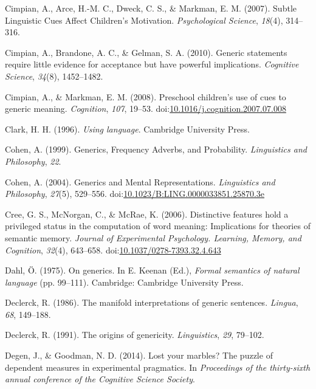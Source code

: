 \documentclass[english,,man,floatsintext]{apa6}
\theoremstyle{definition}
\theoremstyle{definition}
\theoremstyle{definition}
\theoremstyle{remark}
\begin{document}
\leavevmode\hypertarget{ref-Cimpian2007}{}%
Cimpian, A., Arce, H.-M. C., Dweck, C. S., \& Markman, E. M. (2007).
Subtle Linguistic Cues Affect Children's Motivation. \emph{Psychological
Science}, \emph{18}(4), 314--316.

\leavevmode\hypertarget{ref-Cimpian2010}{}%
Cimpian, A., Brandone, A. C., \& Gelman, S. A. (2010). Generic
statements require little evidence for acceptance but have powerful
implications. \emph{Cognitive Science}, \emph{34}(8), 1452--1482.

\leavevmode\hypertarget{ref-Cimpian2008}{}%
Cimpian, A., \& Markman, E. M. (2008). Preschool children's use of cues
to generic meaning. \emph{Cognition}, \emph{107}, 19--53.
doi:\href{https://doi.org/10.1016/j.cognition.2007.07.008}{10.1016/j.cognition.2007.07.008}

\leavevmode\hypertarget{ref-Clark1996}{}%
Clark, H. H. (1996). \emph{Using language}. Cambridge University Press.

\leavevmode\hypertarget{ref-Cohen1999}{}%
Cohen, A. (1999). Generics, Frequency Adverbs, and Probability.
\emph{Linguistics and Philosophy}, \emph{22}.

\leavevmode\hypertarget{ref-Cohen2004}{}%
Cohen, A. (2004). Generics and Mental Representations. \emph{Linguistics
and Philosophy}, \emph{27}(5), 529--556.
doi:\href{https://doi.org/10.1023/B:LING.0000033851.25870.3e}{10.1023/B:LING.0000033851.25870.3e}

\leavevmode\hypertarget{ref-Cree2006}{}%
Cree, G. S., McNorgan, C., \& McRae, K. (2006). Distinctive features
hold a privileged status in the computation of word meaning:
Implications for theories of semantic memory. \emph{Journal of
Experimental Psychology. Learning, Memory, and Cognition}, \emph{32}(4),
643--658.
doi:\href{https://doi.org/10.1037/0278-7393.32.4.643}{10.1037/0278-7393.32.4.643}

\leavevmode\hypertarget{ref-Dahl1975}{}%
Dahl, Ö. (1975). On generics. In E. Keenan (Ed.), \emph{Formal semantics
of natural language} (pp. 99--111). Cambridge: Cambridge University
Press.

\leavevmode\hypertarget{ref-Declerck1986}{}%
Declerck, R. (1986). The manifold interpretations of generic sentences.
\emph{Lingua}, \emph{68}, 149--188.

\leavevmode\hypertarget{ref-Declerck1991}{}%
Declerck, R. (1991). The origins of genericity. \emph{Linguistics},
\emph{29}, 79--102.

\leavevmode\hypertarget{ref-Degen2014}{}%
Degen, J., \& Goodman, N. D. (2014). Lost your marbles? The puzzle of
dependent measures in experimental pragmatics. In \emph{Proceedings of
the thirty-sixth annual conference of the Cognitive Science Society}.
\end{document}
